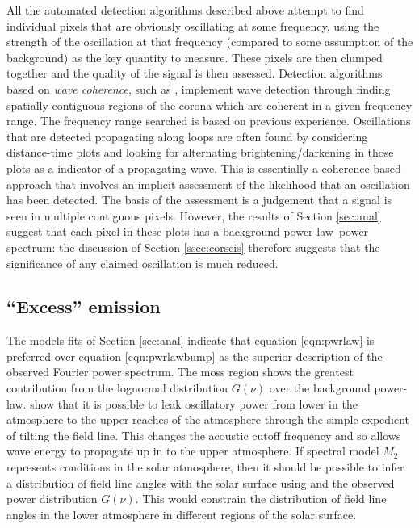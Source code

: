 \documentclass[onecolumn]{emulateapj}
\newcommand{\PS}{power spectrum}
\newcommand{\PL}{power-law}
\begin{document}
All the automated detection algorithms described above attempt to find
individual pixels that are obviously oscillating at some frequency,
using the strength of the oscillation at that frequency (compared to
some assumption of the background) as the key quantity to measure.
These pixels are then clumped together and the quality of the signal
is then assessed.  Detection algorithms based on {\it wave coherence},
such as \cite{2008SoPh..252..321M}, implement wave detection through
finding spatially contiguous regions of the corona which are coherent
in a given frequency range.  The frequency range searched is based on
previous experience.  Oscillations that are detected propagating along
loops are often found by considering distance-time plots
\citep{2000AA...355L..23D, 2003AA...404L...1K} and looking for
alternating brightening/darkening in those plots as a indicator of a
propagating wave.  This is essentially a coherence-based approach that
involves an implicit assessment of the likelihood that an oscillation
has been detected.  The basis of the assessment is a judgement that a
signal is seen in multiple contiguous pixels.  However, the results of
Section \ref{sec:anal} suggest that each pixel in these plots has a
background \PL\ \PS: the discussion of Section \ref{ssec:corseis}
therefore suggests that the significance of any claimed oscillation is
much reduced.


\subsection{``Excess'' emission}\label{ssec:excess}
The models fits of Section \ref{sec:anal} indicate that equation
\ref{eqn:pwrlaw} is preferred over equation \ref{eqn:pwrlawbump} as
the superior description of the observed Fourier \PS. The
moss region shows the greatest contribution from the lognormal
distribution $G(\nu)$ over the background \PL.
\cite{2005ApJ...624L..61D} show that it is possible to leak
oscillatory power from lower in the atmosphere to the upper reaches of
the atmosphere through the simple expedient of tilting the field line.
This changes the acoustic cutoff frequency and so allows wave energy
to propagate up in to the upper atmosphere.  If spectral model $M_{2}$
represents conditions in the solar atmosphere, then it should be
possible to infer a distribution of field line angles with the solar
surface using \cite{2005ApJ...624L..61D} and the observed power
distribution $G(\nu)$.  This would constrain the distribution of field
line angles in the lower atmosphere in different regions of the solar
surface.
\end{document}
